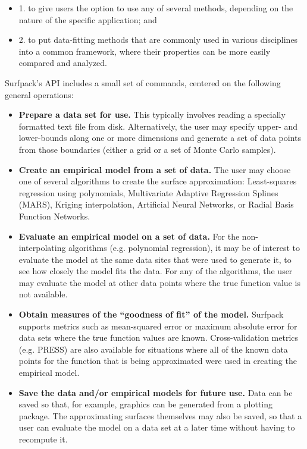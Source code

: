 \documentclass{article}
\begin{document}
\begin{itemize}
\item 1. to give users the option to use any of several methods, depending on the nature of the specific application; and
\item 2. to put data-fitting methods that are commonly used in various disciplines into a common framework, where their properties can be more easily compared and analyzed.
\end{itemize}
Surfpack's API includes a small set of commands, centered on the following general operations:
\begin{itemize}
\item {\bf Prepare a data set for use.}  This typically involves reading a specially formatted text file from disk.  Alternatively, the user may specify upper- and lower-bounds along one or more dimensions and generate a set of data points from those boundaries (either a grid or a set of Monte Carlo samples).
\item {\bf Create an empirical model from a set of data.} The user may choose one of several algorithms to create the surface approximation: Least-squares regression using polynomials, Multivariate Adaptive Regression Splines (MARS), Kriging interpolation, Artificial Neural Networks, or Radial Basis Function Networks.
\item {\bf Evaluate an empirical model on a set of data.}  For the non-interpolating algorithms (e.g. polynomial regression), it may be of interest to evaluate the model at the same data sites that were used to generate it, to see how closely the model fits the data.  For any of the algorithms, the user may evaluate the model at other data points where the true function value is not available.
\item {\bf Obtain measures of the ``goodness of fit'' of the model.}  Surfpack supports metrics such as mean-squared error or maximum absolute error for data sets where the true function values are known.  Cross-validation metrics (e.g. PRESS) are also available for situations where all of the known data points for the function that is being approximated were used in creating the empirical model.
\item {\bf Save the data and/or empirical models for future use.}  Data can be saved so that, for example, graphics can be generated from a plotting package.  The approximating surfaces themselves may also be saved, so that a user can evaluate the model on a data set at a later time without having to recompute it.
\end{itemize}
\end{document}

